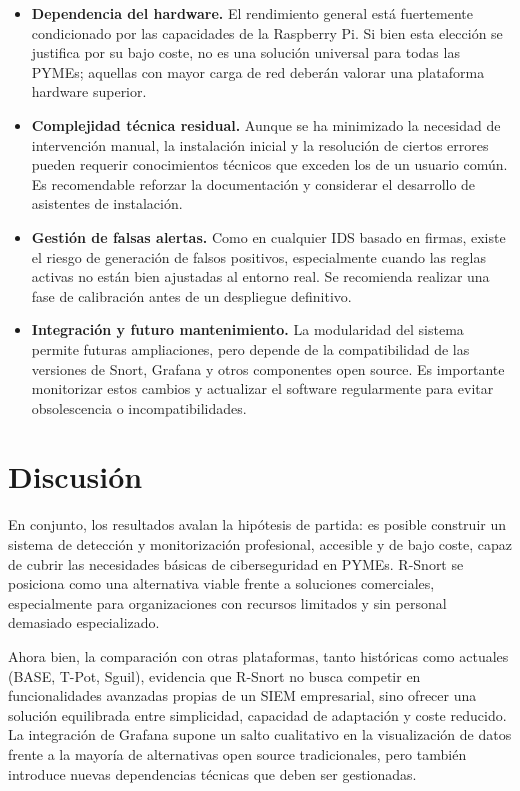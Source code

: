 \documentclass[11pt,a4paper,twoside]{report}
\begin{document}
\begin{itemize}
	\item \textbf{Dependencia del hardware.} El rendimiento general está fuertemente condicionado por las capacidades de la Raspberry Pi. Si bien esta elección se justifica por su bajo coste, no es una solución universal para todas las PYMEs; aquellas con mayor carga de red deberán valorar una plataforma hardware superior.
	\item \textbf{Complejidad técnica residual.} Aunque se ha minimizado la necesidad de intervención manual, la instalación inicial y la resolución de ciertos errores pueden requerir conocimientos técnicos que exceden los de un usuario común. Es recomendable reforzar la documentación y considerar el desarrollo de asistentes de instalación.
	\item \textbf{Gestión de falsas alertas.} Como en cualquier IDS basado en firmas, existe el riesgo de generación de falsos positivos, especialmente cuando las reglas activas no están bien ajustadas al entorno real. Se recomienda realizar una fase de calibración antes de un despliegue definitivo.
	\item \textbf{Integración y futuro mantenimiento.} La modularidad del sistema permite futuras ampliaciones, pero depende de la compatibilidad de las versiones de Snort, Grafana y otros componentes open source. Es importante monitorizar estos cambios y actualizar el software regularmente para evitar obsolescencia o incompatibilidades.
\end{itemize}

\section{Discusión}

En conjunto, los resultados avalan la hipótesis de partida: es posible construir un sistema de detección y monitorización profesional, accesible y de bajo coste, capaz de cubrir las necesidades básicas de ciberseguridad en PYMEs. R-Snort se posiciona como una alternativa viable frente a soluciones comerciales, especialmente para organizaciones con recursos limitados y sin personal demasiado especializado.\newline

Ahora bien, la comparación con otras plataformas, tanto históricas como actuales (BASE, T-Pot, Sguil), evidencia que R-Snort no busca competir en funcionalidades avanzadas propias de un SIEM empresarial, sino ofrecer una solución equilibrada entre simplicidad, capacidad de adaptación y coste reducido. La integración de Grafana supone un salto cualitativo en la visualización de datos frente a la mayoría de alternativas open source tradicionales, pero también introduce nuevas dependencias técnicas que deben ser gestionadas.\newline
\end{document}
